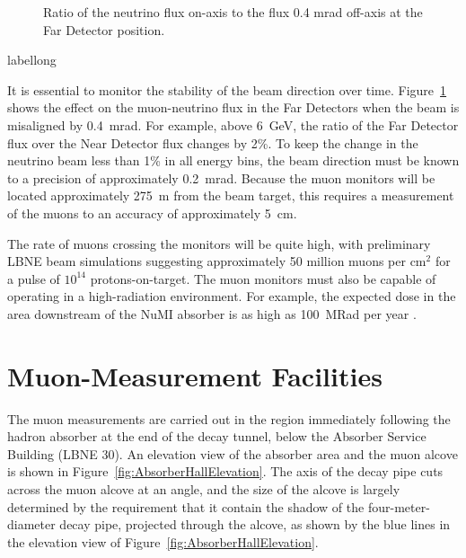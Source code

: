 \begin{figure}[htbp]
\begin{center}
\caption[Ratio of the flux on-axis to the flux 0.4~mrad off-axis]
{ Ratio of the neutrino flux on-axis to the flux 0.4 mrad off-axis at the Far
Detector position.}
\label{fig:fluxRatio}
\end{center}
\end{figure}
\begin{cdrfigure}[short]{label}{long}
\end{cdrfigure}
It is essential to monitor the stability of the beam direction over
time. Figure~\ref{fig:fluxRatio} shows the effect on the muon-neutrino
flux in the Far Detectors when the beam is misaligned by 0.4~mrad.  
For example, above 6~GeV, the ratio of the Far Detector flux over 
the Near Detector flux changes by 2\%.  
To keep the change in the neutrino beam less than 1\% in all energy bins,
the beam direction must be known to a precision of approximately 0.2~mrad. 
Because the muon monitors will be located approximately 275~m
from the beam target, this requires a measurement of the muons to an
accuracy of approximately 5~cm.


The rate of muons crossing the monitors will be quite high, with
preliminary LBNE beam simulations suggesting approximately 50 million
muons per cm$^{2}$ for a pulse of $10^{14}$ protons-on-target. The
muon monitors must also be capable of operating in a high-radiation
environment.  For example, the expected dose in the area downstream of
the NuMI absorber is as high as 100~MRad per year \cite{ref:NuMIBeamMonitors}.

%
%
\section{Muon-Measurement Facilities}

The muon measurements are carried out in the region immediately
following the hadron absorber at the end of the decay tunnel, below
the Absorber Service Building (LBNE 30).  An elevation view
of the absorber area and the muon alcove is shown in Figure~\ref{fig:AbsorberHallElevation}. 
The axis of the decay pipe cuts across the muon alcove at an angle, and the size of the alcove
is largely determined by the requirement that it contain the
shadow of the four-meter-diameter decay pipe, projected through the
alcove, as shown by the blue lines in the elevation view of Figure~\ref{fig:AbsorberHallElevation}. 


